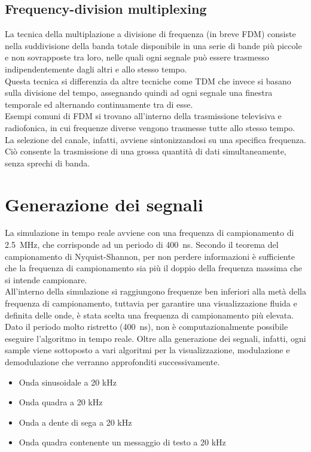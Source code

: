 \documentclass{article}
\begin{document}
\subsection{Frequency-division multiplexing}
La tecnica della multiplazione a divisione di frequenza (in breve FDM) consiste nella suddivisione della banda totale disponibile
in una serie di bande più piccole e non sovrapposte tra loro, nelle quali ogni segnale può essere trasmesso indipendentemente
dagli altri e allo stesso tempo.\\
Questa tecnica si differenzia da altre tecniche come TDM che invece si basano sulla divisione del tempo, assegnando quindi
ad ogni segnale una finestra temporale ed alternando continuamente tra di esse.\\
Esempi comuni di FDM si trovano all'interno della trasmissione televisiva e radiofonica, in cui frequenze diverse vengono
trasmesse tutte allo stesso tempo. La selezione del canale, infatti, avviene sintonizzandosi su una specifica frequenza.
Ciò consente la trasmissione di una grossa quantità di dati simultaneamente, senza sprechi di banda.

\section{Generazione dei segnali}
La simulazione in tempo reale avviene con una frequenza di campionamento di \SI{2.5}{\MHz}, che corrisponde ad un periodo di
\SI{400}{\ns}. Secondo il teorema del campionamento di Nyquist-Shannon, per non perdere informazioni è sufficiente che la frequenza
di campionamento sia più il doppio della frequenza massima che si intende campionare.\\
All'interno della simulazione si raggiungono frequenze ben inferiori alla metà della frequenza di campionamento, tuttavia
per garantire una visualizzazione fluida e definita delle onde, è stata scelta una frequenza di campionamento più elevata.
Dato il periodo molto ristretto (\SI{400}{ns}), non è computazionalmente possibile eseguire l'algoritmo in tempo reale. Oltre
alla generazione dei segnali, infatti, ogni sample viene sottoposto a vari algoritmi per la visualizzazione,
modulazione e demodulazione che verranno approfonditi successivamente.\\

\begin{itemize}
    \item Onda sinusoidale a 20 kHz
    \item Onda quadra a 20 kHz
    \item Onda a dente di sega a 20 kHz
    \item Onda quadra contenente un messaggio di testo a 20 kHz
\end{itemize}
\end{document}
